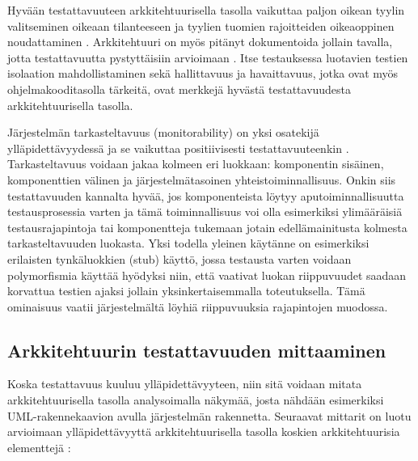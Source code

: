\documentclass[finnish]{tktltiki2}
\theoremstyle{definition}
\theoremstyle{remark}
\begin{document}


Hyvään testattavuuteen arkkitehtuurisella tasolla vaikuttaa paljon oikean tyylin valitseminen oikeaan tilanteeseen ja tyylien tuomien rajoitteiden oikeaoppinen noudattaminen \citep{Eickelmann:1996:MOS:243327.243602}. Arkkitehtuuri on myös pitänyt dokumentoida jollain tavalla, jotta testattavuutta pystyttäisiin arvioimaan \citep[s. 6]{mari_impact_2003}. Itse testauksessa luotavien testien isolaation mahdollistaminen sekä hallittavuus ja havaittavuus, jotka ovat myös ohjelmakooditasolla tärkeitä, ovat merkkejä hyvästä testattavuudesta arkkitehtuurisella tasolla.


Järjestelmän tarkasteltavuus (monitorability) on yksi osatekijä ylläpidettävyydessä ja se vaikuttaa positiivisesti testattavuuteenkin \citep[s. 4]{mari_impact_2003}. Tarkasteltavuus voidaan jakaa kolmeen eri luokkaan: komponentin sisäinen, komponenttien välinen ja järjestelmätasoinen yhteistoiminnallisuus. Onkin siis testattavuuden kannalta hyvää, jos komponenteista löytyy aputoiminnallisuutta testausprosessia varten ja tämä toiminnallisuus voi olla esimerkiksi ylimääräisiä testausrajapintoja tai komponentteja tukemaan jotain edellämainitusta kolmesta tarkasteltavuuden luokasta. Yksi todella yleinen käytänne on esimerkiksi erilaisten tynkäluokkien (stub) käyttö, jossa testausta varten voidaan polymorfismia käyttää hyödyksi niin, että vaativat luokan riippuvuudet saadaan korvattua testien ajaksi jollain yksinkertaisemmalla toteutuksella. Tämä ominaisuus vaatii järjestelmältä löyhiä riippuvuuksia rajapintojen muodossa.


\subsection{Arkkitehtuurin testattavuuden mittaaminen}

Koska testattavuus kuuluu ylläpidettävyyteen, niin sitä voidaan mitata arkkitehtuurisella tasolla analysoimalla näkymää, josta nähdään esimerkiksi UML-rakennekaavion avulla järjestelmän rakennetta. Seuraavat mittarit on luotu arvioimaan ylläpidettävyyttä arkkitehtuurisella tasolla koskien arkkitehtuurisia elementtejä \citep[s. 3-4]{bengtsson1998towards}:
\end{document}
